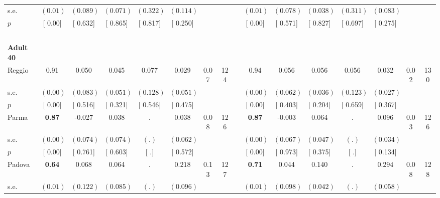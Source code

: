 \begin{longtable}{L{8em} c c c c c c c p{1em} c c c c c c c}
\quad \quad \quad \quad s.e.& $ (     0.01)$ & $ (    0.089)$ & $ (    0.071)$ & $ (    0.322)$ & $ (    0.114)$ & & & & $ (     0.01)$ & $ (    0.078)$ & $ (    0.038)$ & $ (    0.311)$ & $ (    0.083)$ & &  \\*
\quad \quad \quad \quad $ p$ & [     0.00] & [    0.632] & [    0.865] & [    0.817] & [    0.250] & & & & [     0.00] & [    0.571] & [    0.827] & [    0.697] & [    0.275] & &  \\[1em]
~\\[1em]
\quad \quad \textbf{Adult 40} & & & & & & & & & & & & & & & \\* 
\quad \quad \quad Reggio& 0.91 &     0.050 &     0.045 &     0.077 &     0.029 &      0.07 &       124 & & 0.94 &     0.056 &     0.056 &     0.056 &     0.032 &      0.02 &       130  \\*
\quad \quad \quad \quad s.e.& $ (     0.00)$ & $ (    0.083)$ & $ (    0.051)$ & $ (    0.128)$ & $ (    0.051)$ & & & & $ (     0.00)$ & $ (    0.062)$ & $ (    0.036)$ & $ (    0.123)$ & $ (    0.027)$ & &  \\*
\quad \quad \quad \quad $ p$ & [     0.00] & [    0.516] & [    0.321] & [    0.546] & [    0.475] & & & & [     0.00] & [    0.403] & [    0.204] & [    0.659] & [    0.367] & &  \\[1em]
\quad \quad \quad Parma& \textbf{     0.87} &    -0.027 &     0.038 &         . &     0.038 &      0.08 &       126 & & \textbf{     0.87} &    -0.003 &     0.064 &         . &     0.096 &      0.03 &       126  \\*
\quad \quad \quad \quad s.e.& $ (     0.00)$ & $ (    0.074)$ & $ (    0.074)$ & $ (        .)$ & $ (    0.062)$ & & & & $ (     0.00)$ & $ (    0.067)$ & $ (    0.047)$ & $ (        .)$ & $ (    0.034)$ & &  \\*
\quad \quad \quad \quad $ p$ & [     0.00] & [    0.761] & [    0.603] & [        .] & [    0.572] & & & & [     0.00] & [    0.973] & [    0.375] & [        .] & [    0.134] & &  \\[1em]
\quad \quad \quad Padova& \textbf{     0.64} &     0.068 &     0.064 &         . & $ \mathbf{    0.218}$ &      0.13 &       127 & & \textbf{     0.71} &     0.044 &     0.140 &         . & $ \mathbf{    0.294}$ &      0.08 &       128  \\*
\quad \quad \quad \quad s.e.& $ (     0.01)$ & $ (    0.122)$ & $ (    0.085)$ & $ (        .)$ & $ (    0.096)$ & & & & $ (     0.01)$ & $ (    0.098)$ & $ (    0.042)$ & $ (        .)$ & $ (    0.058)$ & &  \\*

\end{longtable}
